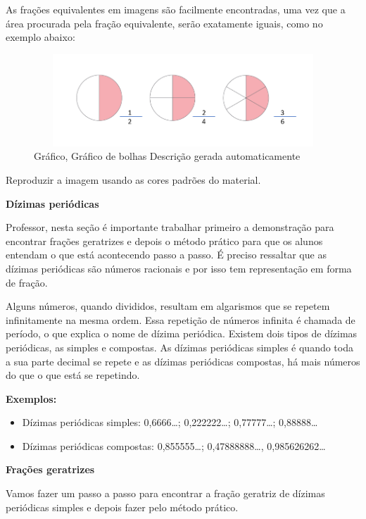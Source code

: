 {{{As frações equivalentes em imagens são facilmente encontradas, uma vez
que a área procurada pela fração equivalente, serão exatamente iguais,
como no exemplo abaixo:

\begin{figure}
\centering
\includegraphics[width=5.15682in,height=1.36473in]{./imgSAEB_7_MAT/media/image6.png}
\caption{Gráfico, Gráfico de bolhas Descrição gerada automaticamente}
\end{figure}

Reproduzir a imagem usando as cores padrões do material.

\textbf{Dízimas periódicas}

Professor, nesta seção é importante trabalhar primeiro a demonstração
para encontrar frações geratrizes e depois o método prático para que os
alunos entendam o que está acontecendo passo a passo. É preciso
ressaltar que as dízimas periódicas são números racionais e por isso tem
representação em forma de fração.

Alguns números, quando divididos, resultam em algarismos que se repetem
infinitamente na mesma ordem. Essa repetição de números infinita é
chamada de período, o que explica o nome de dízima periódica. Existem
dois tipos de dízimas periódicas, as simples e compostas. As dízimas
periódicas simples é quando toda a sua parte decimal se repete e as
dízimas periódicas compostas, há mais números do que o que está se
repetindo.

\textbf{Exemplos:}

\begin{itemize}
\item
  Dízimas periódicas simples: 0,6666\ldots; 0,222222\ldots;
  0,77777\ldots; 0,88888\ldots{}
\item
  Dízimas periódicas compostas: 0,855555\ldots; 0,47888888\ldots,
  0,985626262\ldots{}
\end{itemize}

\textbf{Frações geratrizes}

Vamos fazer um passo a passo para encontrar a fração geratriz de dízimas
periódicas simples e depois fazer pelo método prático.

}}}
